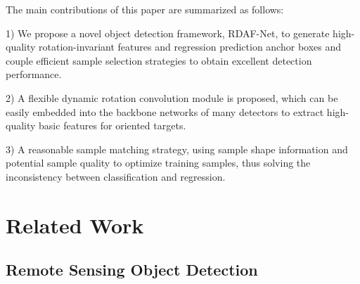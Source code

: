 \documentclass[journal]{IEEEtran}
\begin{document}
The main contributions of this paper are summarized as follows:

1) We propose a novel object detection framework, RDAF-Net, to generate high-quality rotation-invariant features and regression prediction anchor boxes and couple efficient sample selection strategies to obtain excellent detection performance.

2) A flexible dynamic rotation convolution module is proposed, which can be easily embedded into the backbone networks of many detectors to extract high-quality basic features for oriented targets.

3) A reasonable sample matching strategy, using sample shape information and potential sample quality to optimize training samples, thus solving the inconsistency between classification and regression.

\section{ Related Work }

\subsection{ Remote Sensing Object Detection }
\end{document}
